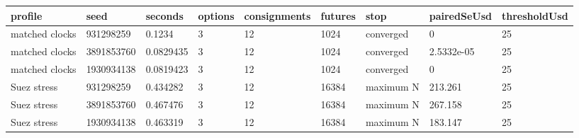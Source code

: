 \begin{tabular}{lllllllll}
\toprule
profile & seed & seconds & options & consignments & futures & stop & pairedSeUsd & thresholdUsd \\
\midrule
matched clocks & 931298259 & 0.1234 & 3 & 12 & 1024 & converged & 0 & 25 \\
matched clocks & 3891853760 & 0.0829435 & 3 & 12 & 1024 & converged & 2.5332e-05 & 25 \\
matched clocks & 1930934138 & 0.0819423 & 3 & 12 & 1024 & converged & 0 & 25 \\
Suez stress & 931298259 & 0.434282 & 3 & 12 & 16384 & maximum N & 213.261 & 25 \\
Suez stress & 3891853760 & 0.467476 & 3 & 12 & 16384 & maximum N & 267.158 & 25 \\
Suez stress & 1930934138 & 0.463319 & 3 & 12 & 16384 & maximum N & 183.147 & 25 \\
\bottomrule
\end{tabular}
